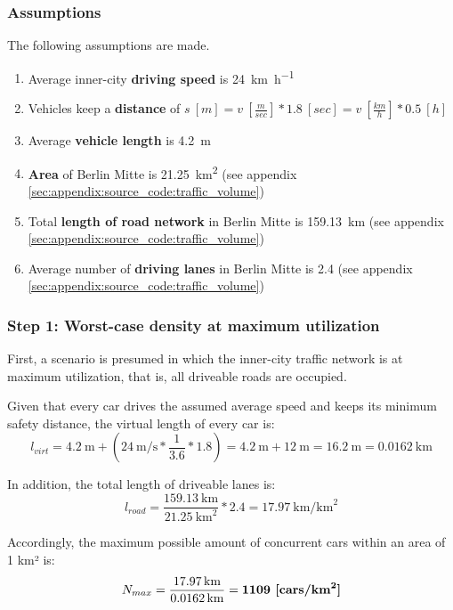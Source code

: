 \subsubsection{Assumptions}
The following assumptions are made.

\begin{samepage}
\begin{enumerate}
	\item Average inner-city \textbf{driving speed} is \SI{24}{\kilo\meter\per\hour} \cite{Forbes2008}
	\item Vehicles keep a \textbf{distance} of $s \ [m] = v \ [\frac{m}{sec}] * 1.8 \ [sec] = v \  [\frac{km}{h}] * 0.5 \ [h]$ \cite{wiki:sicherheitsabstand}
	\item Average \textbf{vehicle length} is \SI{4.2}{\meter}
	\item \textbf{Area} of Berlin Mitte is \SI{21.25}{\square\kilo\meter} (see appendix \cref{sec:appendix:source_code:traffic_volume})
	\item Total \textbf{length of road network} in Berlin Mitte is \SI{159.13}{\kilo\meter} (see appendix \cref{sec:appendix:source_code:traffic_volume})
	\item Average number of \textbf{driving lanes} in Berlin Mitte is 2.4 (see appendix \cref{sec:appendix:source_code:traffic_volume})
\end{enumerate}
\end{samepage}

\subsubsection{Step 1: Worst-case density at maximum utilization}
First, a scenario is presumed in which the inner-city traffic network is at maximum utilization, that is, all driveable roads are occupied.

Given that every car drives the assumed average speed and keeps its minimum safety distance, the virtual length of every car is: $$l_{virt} = \SI{4.2}{\meter} + (\SI{24}{\meter\per\second} * \frac{1}{3.6} * 1.8) = \SI{4.2}{\meter} + \SI{12}{\meter} = \SI{16.2}{\meter} = \SI{0.0162}{\km}$$

In addition, the total length of driveable lanes is:
$$l_{road} = \frac{\SI{159.13}{\km}}{\SI{21.25}{\square\km}} * 2.4 = \SI{17.97}{\km\per\square\km}$$

Accordingly, the maximum possible amount of concurrent cars within an area of 1 km² is:
$$N_{max} = \frac{\SI{17.97}{\km}}{\SI{0.0162}{\km}} = \textbf{1109 [\si[detect-weight]{cars\per\square\km}]}$$


